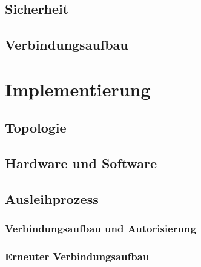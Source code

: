 \documentclass[doktyp=barbeit]{TUBAFarbeiten}
\begin{document}
	\subsection{Sicherheit}
		\label{sec: infra sicherheit}
		

	\subsection{Verbindungsaufbau}
		\label{sec: infra verbindungsaufbau}
		

\newpage
\section{Implementierung}
	\label{sec: impl allg}
	

	\subsection{Topologie}
		\label{sec: impl topologie}
		

	\subsection{Hardware und Software}
		\label{sec: impl soft hard}
		

	\subsection{Ausleihprozess}
		\label{sec: impl ausleih allg}
		

		\subsubsection{Verbindungsaufbau und Autorisierung}
			\label{sec: impl verbindungsaufbau und autorisierung}
			

		\subsubsection{Erneuter Verbindungsaufbau}
			\label{sec: impl erneuter verbindungsaufbau}
			
\end{document}
